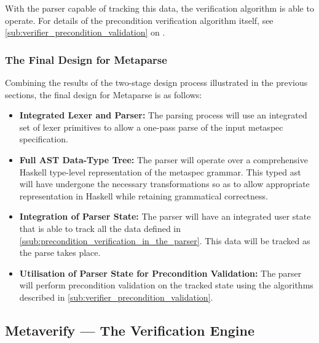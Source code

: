 With the parser capable of tracking this data, the verification algorithm is able to operate.
For details of the precondition verification algorithm itself, see \autoref{sub:verifier_precondition_validation} on . 


\subsubsection{The Final Design for Metaparse} %
\label{ssub:the_final_design_for_metaparse}

Combining the results of the two-stage design process illustrated in the previous sections, the final design for Metaparse is as follows:
\begin{itemize}
    \item \textbf{Integrated Lexer and Parser:} The parsing process will use an integrated set of lexer primitives to allow a one-pass parse of the input \gls{metaspec} specification. 
    \item \textbf{Full AST Data-Type Tree:} The parser will operate over a comprehensive Haskell type-level representation of the \gls{metaspec} grammar. 
    This typed \gls{ast} will have undergone the necessary transformations so as to allow appropriate representation in Haskell while retaining grammatical correctness. 
    \item \textbf{Integration of Parser State:} The parser will have an integrated user state that is able to track all the data defined in \autoref{ssub:precondition_verification_in_the_parser}.
    This data will be tracked as the parse takes place. 
    \item \textbf{Utilisation of Parser State for Precondition Validation:}
    The parser will perform precondition validation on the tracked state using the algorithms described in \autoref{sub:verifier_precondition_validation}.
\end{itemize}



\subsection{Metaverify --- The Verification Engine} %
\label{sub:metaverify_the_verification_engine}

